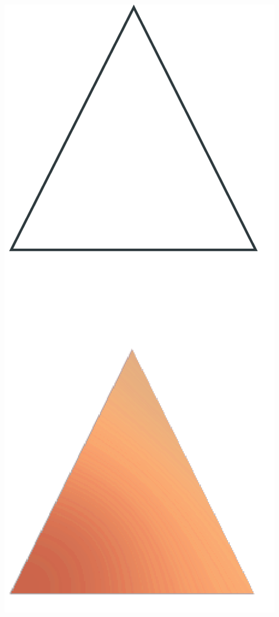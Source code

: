 \begin{frame}
\begin{columns}
\begin{column}[b]{0.22\textwidth}
\begin{center}
					\includegraphics[width=\textwidth]{./img/1_single/lod_lod0.png}

\end{center}
\end{column}
\end{columns}
\end{frame}
